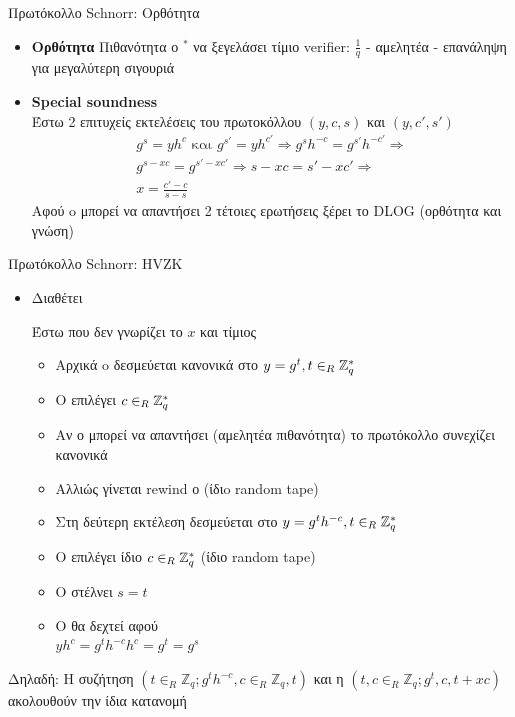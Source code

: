 \documentclass[handout]{beamer}
\begin{document}
\begin{frame}{Πρωτόκολλο Schnorr: Ορθότητα}
\begin{itemize}
\item \textbf{Ορθότητα} 
Πιθανότητα ο \prv$^*$ να ξεγελάσει τίμιο verifier: $\frac{1}{q}$ - αμελητέα - επανάληψη για μεγαλύτερη σιγουριά
\pause
\item \textbf{Special soundness}\\
Έστω 2 επιτυχείς εκτελέσεις του πρωτοκόλλου $(y,c,s)$ και $(y,c',s')$
\pause
\begin{align*}
 g^s = yh^c  \text{ και }  g^{s'} = yh^{c'}  \Rightarrow  g^s h^{-c}   = g^{s'} h^{-c'}  \Rightarrow \\
 g^{s-xc} = g^{s'-xc'} \Rightarrow  s-xc = s'-xc' \Rightarrow \\
 x = \frac{c'-c}{s-s}
\end{align*}
\pause
Αφού o \prv μπορεί να απαντήσει 2 τέτοιες ερωτήσεις ξέρει το DLOG
(ορθότητα και γνώση)
\end{itemize}
\end{frame}


\begin{frame}{Πρωτόκολλο Schnorr: HVZK}
\begin{itemize}
\item Διαθέτει 

Έστω  \siml που δεν γνωρίζει το $x$ και τίμιος \ver 
\pause
\begin{itemize}
\item Αρχικά o \siml δεσμεύεται κανονικά στο $y=g^t, t \in_R \mathbb{Z}^*_{q}$
\pause
\item Ο \ver επιλέγει $c \in_R \mathbb{Z}^*_{q}$
\pause
\item Αν ο \siml μπορεί να απαντήσει (αμελητέα πιθανότητα) το πρωτόκολλο συνεχίζει κανονικά \pause
\item Αλλιώς γίνεται rewind ο \ver (ίδιo random tape) \pause
\item Στη δεύτερη εκτέλεση \siml δεσμεύεται στο $y=g^t h^{-c}, t \in_R \mathbb{Z}^*_{q}$ \pause
\item Ο \ver επιλέγει ίδιο $c \in_R \mathbb{Z}^*_{q}$ (ίδιο random tape) \pause
\item O \siml στέλνει $s=t$ \pause
\item Ο \ver θα δεχτεί αφού \\
$yh^{c} = g^t  h^{-c} h^{c} = g^t = g^s$ \\
\end{itemize}
\end{itemize}
\pause
 
\begin{block}{Δηλαδή:}
Η συζήτηση $(t \in_R \mathbb{Z}_q; g^t h^{-c}   , c \in_R \mathbb{Z}_q  , t )$ 
 και η $(t,c \in_R \mathbb{Z}_q;  g^t  , c  , t+xc  )$
 ακολουθούν την ίδια κατανομή
 \end{block}
\end{frame}
\end{document}
